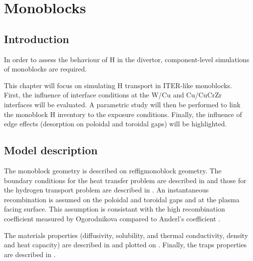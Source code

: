 \setchapterpreamble[u]{\margintoc}
\chapter{Monoblocks}\label{Chapter3}

\section{Introduction}

In order to assess the behaviour of H in the divertor, component-level simulations of monoblocks are required.

This chapter will focus on simulating H transport in ITER-like monoblocks.
First, the influence of interface conditions at the W/Cu and Cu/CuCrZr interfaces will be evaluated.
A parametric study will then be performed to link the monoblock H inventory to the exposure conditions.
Finally, the influence of edge effects (desorption on poloidal and toroidal gaps) will be highlighted.

\section{Model description}

The monoblock geometry is described on reffig{monoblock geometry}.
The boundary conditions for the heat transfer problem are described in  and those for the hydrogen transport problem are described in .
An instantaneous recombination is assumed on the poloidal and toroidal gaps and at the plasma facing surface.
This assumption is consistant with the high recombination coefficient measured by Ogorodnikova  compared to Anderl's coefficient .

The materials properties (diffusivity, solubility, and thermal conductivity, density and heat capacity) are described in  and plotted on .
Finally, the traps properties are described in .

